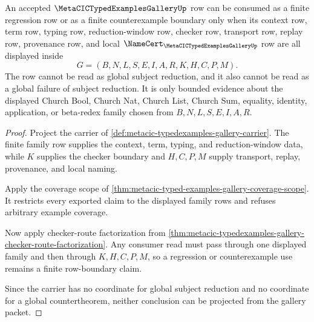 \begin{theorem}
\label{thm:metacic-typedexamples-gallery-subject-reduction-counterexample-boundary}
An accepted $\MetaCICTypedExamplesGalleryUp$ row can be consumed as a finite regression row or as a finite counterexample boundary only when its context row, term row, typing row, reduction-window row, checker row, transport row, replay row, provenance row, and local $\NameCert_{\MetaCICTypedExamplesGalleryUp}$ row are all displayed inside
$$
G=(B,N,L,S,E,I,A,R,K,H,C,P,M).
$$
The row cannot be read as global subject reduction, and it also cannot be read as a global failure of subject reduction. It is only bounded evidence about the displayed Church Bool, Church Nat, Church List, Church Sum, equality, identity, application, or beta-redex family chosen from $B,N,L,S,E,I,A,R$.
\end{theorem}
\begin{proof}
Project the carrier of \autoref{def:metacic-typedexamples-gallery-carrier}. The finite family row supplies the context, term, typing, and reduction-window data, while $K$ supplies the checker boundary and $H,C,P,M$ supply transport, replay, provenance, and local naming.

Apply the coverage scope of \autoref{thm:metacic-typed-examples-gallery-coverage-scope}. It restricts every exported claim to the displayed family rows and refuses arbitrary example coverage.

Now apply checker-route factorization from \autoref{thm:metacic-typedexamples-gallery-checker-route-factorization}. Any consumer read must pass through one displayed family and then through $K,H,C,P,M$, so a regression or counterexample use remains a finite row-boundary claim.

Since the carrier has no coordinate for global subject reduction and no coordinate for a global countertheorem, neither conclusion can be projected from the gallery packet.
\end{proof}

